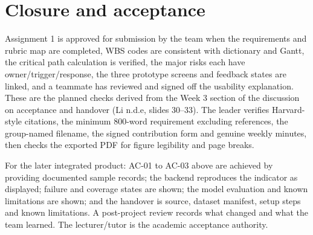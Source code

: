 \section{Closure and acceptance}
\label{sec:closure}

Assignment 1 is approved for submission by the team when the requirements and rubric map are completed, WBS codes are consistent with dictionary and Gantt, the critical path calculation is verified, the major risks each have owner/trigger/response, the three prototype screens and feedback states are linked, and a teammate has reviewed and signed off the usability explanation. These are the planned checks derived from the Week 3 section of the discussion on acceptance and handover (Li n.d.e, slides 30–33). The leader verifies Harvard-style citations, the minimum 800-word requirement excluding references, the group-named filename, the signed contribution form and genuine weekly minutes, then checks the exported PDF for figure legibility and page breaks.

For the later integrated product: AC-01 to AC-03 above are achieved by providing documented sample records; the backend reproduces the indicator as displayed; failure and coverage states are shown; the model evaluation and known limitations are shown; and the handover is source, dataset manifest, setup steps and known limitations. A post-project review records what changed and what the team learned. The lecturer/tutor is the academic acceptance authority.
